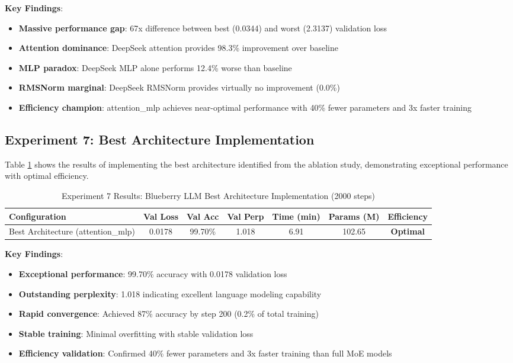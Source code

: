 \documentclass[11pt,a4paper]{article}
\begin{document}
\textbf{Key Findings}:
\begin{itemize}
    \item \textbf{Massive performance gap}: 67x difference between best (0.0344) and worst (2.3137) validation loss
    \item \textbf{Attention dominance}: DeepSeek attention provides 98.3\% improvement over baseline
    \item \textbf{MLP paradox}: DeepSeek MLP alone performs 12.4\% worse than baseline
    \item \textbf{RMSNorm marginal}: DeepSeek RMSNorm provides virtually no improvement (0.0\%)
    \item \textbf{Efficiency champion}: attention\_mlp achieves near-optimal performance with 40\% fewer parameters and 3x faster training
\end{itemize}

\subsection{Experiment 7: Best Architecture Implementation}

Table \ref{tab:exp7_results} shows the results of implementing the best architecture identified from the ablation study, demonstrating exceptional performance with optimal efficiency.

\begin{table}[H]
\centering
\caption{Experiment 7 Results: Blueberry LLM Best Architecture Implementation (2000 steps)}
\label{tab:exp7_results}
\begin{tabular}{@{}lcccccc@{}}
\toprule
Configuration & Val Loss & Val Acc & Val Perp & Time (min) & Params (M) & Efficiency \\
\midrule
Best Architecture (attention\_mlp) & 0.0178 & 99.70\% & 1.018 & 6.91 & 102.65 & \textbf{Optimal} \\
\bottomrule
\end{tabular}
\end{table}

\textbf{Key Findings}:
\begin{itemize}
    \item \textbf{Exceptional performance}: 99.70\% accuracy with 0.0178 validation loss
    \item \textbf{Outstanding perplexity}: 1.018 indicating excellent language modeling capability
    \item \textbf{Rapid convergence}: Achieved 87\% accuracy by step 200 (0.2\% of total training)
    \item \textbf{Stable training}: Minimal overfitting with stable validation loss
    \item \textbf{Efficiency validation}: Confirmed 40\% fewer parameters and 3x faster training than full MoE models
\end{itemize}
\end{document}
